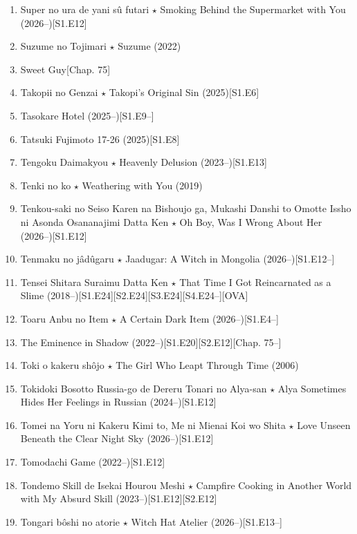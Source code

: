 \documentclass{article}
\begin{document}
\begin{enumerate}
    {\sf Comment.} Truck-kun tông gái xinh không chết, nhưng giấu xác vô vali rồi chôn sống cho chết.
    \item {\sc Super no ura de yani sû futari $\star$ Smoking Behind the Supermarket with You} (2026--)\hfill[S1.E12]
    \item {\sc Suzume no Tojimari $\star$ Suzume} (2022)
    \item {\sc Sweet Guy}\hfill[Chap. 75]
    \item {\sc Takopii no Genzai $\star$ Takopi's Original Sin} (2025)\hfill[S1.E6]
    \item Tasokare Hotel (2025--)\hfill[S1.E9--]
    \item {\sc Tatsuki Fujimoto 17-26} (2025)\hfill[S1.E8]
    \item {\sc Tengoku Daimakyou $\star$ Heavenly Delusion} (2023--)\hfill[S1.E13]
    \item {\sc Tenki no ko $\star$ Weathering with You} (2019)
    \item {\sc Tenkou-saki no Seiso Karen na Bishoujo ga, Mukashi Danshi to Omotte Issho ni Asonda Osananajimi Datta Ken $\star$ Oh Boy, Was I Wrong About Her} (2026--)\hfill[S1.E12]
    \item Tenmaku no jâdûgaru $\star$ Jaadugar: A Witch in Mongolia (2026--)\hfill[S1.E12--]
    \item Tensei Shitara Suraimu Datta Ken $\star$ That Time I Got Reincarnated as a Slime (2018--)\hfill[S1.E24][S2.E24][S3.E24][S4.E24--][OVA]
    \item Toaru Anbu no Item $\star$ A Certain Dark Item (2026--)\hfill[S1.E4--]
    \item The Eminence in Shadow (2022--)\hfill[S1.E20][S2.E12][Chap. 75--]
    \item {\sc Toki o kakeru sh\^ojo $\star$ The Girl Who Leapt Through Time} (2006)
    \item {\sc Tokidoki Bosotto Russia-go de Dereru Tonari no Alya-san $\star$ Alya Sometimes Hides Her Feelings in Russian} (2024--)\hfill[S1.E12]
    \item {\sc Tomei na Yoru ni Kakeru Kimi to, Me ni Mienai Koi wo Shita $\star$ Love Unseen Beneath the Clear Night Sky} (2026--)\hfill[S1.E12]
    \item {\sc Tomodachi Game} (2022--)\hfill[S1.E12]
    \item {\sc Tondemo Skill de Isekai Hourou Meshi $\star$ Campfire Cooking in Another World with My Absurd Skill} (2023--)\hfill[S1.E12][S2.E12]
    \item Tongari bôshi no atorie $\star$ Witch Hat Atelier (2026--)\hfill[S1.E13--]

\end{enumerate}
\end{document}
